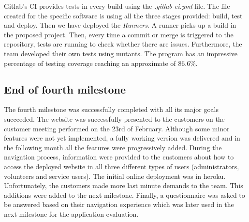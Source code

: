 \documentclass{l3proj}
\begin{document}

Gitlab's CI provides tests in every build using the \textit{.gitlab-ci.yml} file. The file created for the specific software is using all the three stages provided: build, test and deploy. Then we have deployed the \textit{Runners}. A runner picks up a build in the proposed project. Then, every time a commit or merge is triggered to the repository, tests are running to check whether there are issues. Furthermore, the team developed their own tests using mutants. The program has an impressive percentage of testing coverage reaching an approximate of 86.6\%.


\subsection{End of fourth milestone}
\label{sec:milestone4}

The fourth milestone was successfully completed with all its major goals succeeded. The website was successfully presented to the customers on the customer meeting performed on the 23rd of February. Although some minor features were not yet implemented, a fully working version was delivered and in the following month all the features were progressively added. During the navigation process, information were provided to the customers about how to access the deployed website in all three different types of users (administrators, volunteers and service users). The initial online deployment was in heroku. Unfortunately, the customers made more last minute demands to the team. This additions were added to the next milestone. Finally, a questionnaire was asked to be answered based on their navigation experience which was later used in the next milestone for the application evaluation.

\end{document}
